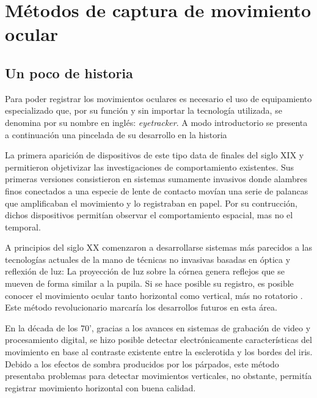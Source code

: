 \documentclass[../main.tex]{subfiles}
\begin{document}
	\section{Métodos de captura de movimiento ocular}
	\label{sub:02_metodos_de_captura}
		\subsection{Un poco de historia} 
		\label{sub:02_un_poco_de_historia_monitores}
			Para poder registrar los movimientos oculares es necesario el uso de equipamiento especializado que, por su función y sin importar la tecnología utilizada, se denomina por su nombre en inglés: \textit{\gls{eyetracker}}. A modo introductorio se presenta a continuación una pincelada de su desarrollo en la historia \cite{article:eyetracker_eggert, article:eyetracker_richardson}

			La primera aparición de dispositivos de este tipo data de finales del siglo XIX \cite{article:eyetracker_hist1, article:eyetracker_hist2} y permitieron objetivizar las investigaciones de comportamiento existentes. Sus primeras versiones consistieron en sistemas sumamente invasivos donde alambres finos conectados a una especie de lente de contacto movían una serie de palancas que amplificaban el movimiento y lo registraban en papel. Por su contrucción, dichos dispositivos permitían observar el comportamiento espacial, mas no el temporal. 

			A principios del siglo XX comenzaron a desarrollarse sistemas más parecidos a las tecnologías actuales de la mano de técnicas no invasivas basadas en óptica y reflexión de luz: La proyección de luz sobre la córnea genera reflejos que se mueven de forma similar a la pupila. Si se hace posible su registro, es posible conocer el movimiento ocular tanto horizontal como vertical, más no rotatorio \cite{article:eyetracker_hist3}. Este método revolucionario marcaría los desarrollos futuros en esta área.

			En la década de los 70', gracias a los avances en sistemas de grabación de video y procesamiento digital, se hizo posible detectar electrónicamente características del movimiento en base al contraste existente entre la \gls{esclerotida} y los bordes del iris. Debido a los efectos de sombra producidos por los párpados, este método presentaba problemas para detectar movimientos verticales, no obstante, permitía registrar movimiento horizontal con buena calidad. 
\end{document}
